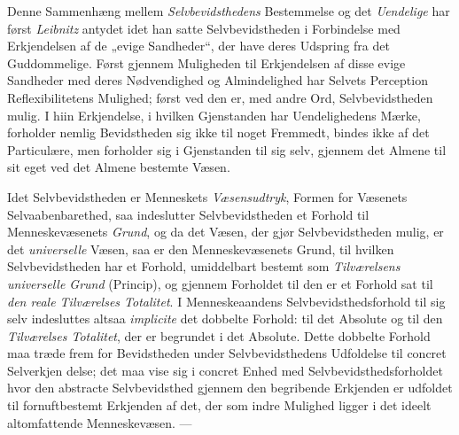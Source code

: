 Denne Sammenhæng mellem \emph{Selvbevidsthedens} Bestemmelse og det
\emph{Uendelige} har først \emph{Leibnitz} antydet idet han satte
Selvbevidstheden i Forbindelse med Erkjendelsen af de „evige Sandheder“, der
have deres Udspring fra det Guddommelige. Først gjennem Muligheden til
Erkjendelsen af disse evige Sandheder med deres Nødvendighed og Almindelighed
har Selvets Perception Reflexibilitetens Mulighed; først ved den er, med andre
Ord, Selvbevidstheden mulig. I hiin Erkjendelse, i hvilken Gjenstanden har
Uendelighedens Mærke, forholder nemlig Bevidstheden sig ikke til noget
Fremmedt, bindes ikke af det Particulære, men forholder sig i Gjenstanden til
sig selv, gjennem det Almene til sit eget ved det Almene bestemte Væsen.

Idet Selvbevidstheden er Menneskets \emph{Væsensudtryk}, Formen for Væsenets
Selvaabenbarethed, saa indeslutter Selvbevidstheden et Forhold til
Menneskevæsenets \emph{Grund}, og da det Væsen, der gjør Selvbevidstheden
mulig, er det \emph{universelle} Væsen, saa er den Menneskevæsenets Grund, til
hvilken Selvbevidstheden har et Forhold, umiddelbart bestemt som
\emph{Tilværelsens universelle Grund} (Princip), og gjennem Forholdet til den
er et Forhold sat til \emph{den reale Tilværelses Totalitet}. I
Menneskeaandens Selvbevidsthedsforhold til sig selv indesluttes altsaa
\textit{implicite} det dobbelte Forhold: til det Absolute og til den
\emph{Tilværelses Totalitet}, der er begrundet i det Absolute. Dette dobbelte
Forhold maa træde frem for Bevidstheden under Selvbevidsthedens Udfoldelse til
concret Selverkjen\-%
delse; det maa vise sig i concret Enhed med
Selvbevidsthedsforholdet hvor den abstracte Selvbevidsthed gjennem den
begribende Erkjenden er udfoldet til fornuftbestemt Erkjenden af det, der som
indre Mulighed ligger i det ideelt altomfattende Menneskevæsen. ---

